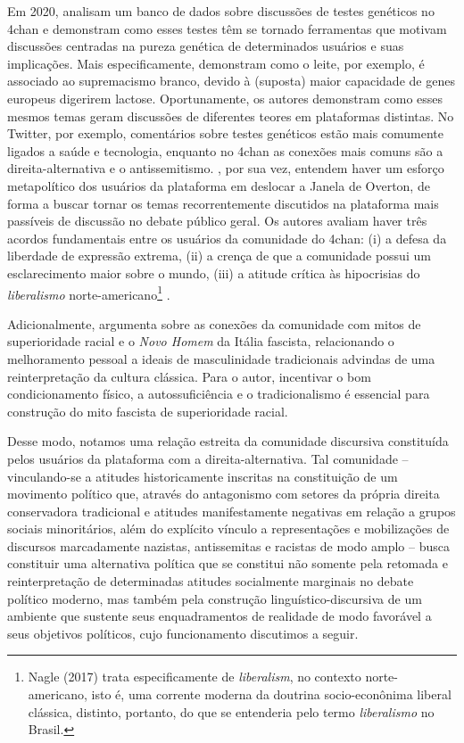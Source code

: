 \documentclass[portuguese]{textolivre}
\begin{document}
Em 2020, \cite{mittos2020analyzing} analisam um banco de dados sobre discussões de testes genéticos no 4chan e demonstram como esses testes têm se tornado ferramentas que motivam discussões centradas na pureza genética de determinados usuários e suas implicações. Mais especificamente, demonstram como o leite, por exemplo, é associado ao supremacismo branco, devido à (suposta) maior capacidade de genes europeus digerirem lactose. Oportunamente, os autores demonstram como esses mesmos temas geram discussões de diferentes teores em plataformas distintas. No Twitter, por exemplo, comentários sobre testes genéticos estão mais comumente ligados a saúde e tecnologia, enquanto no 4chan as conexões mais comuns são a direita-alternativa e o antissemitismo. \textcite{colley2022challenges}, por sua vez, entendem haver um esforço metapolítico dos usuários da plataforma em deslocar a Janela de Overton, de forma a buscar tornar os temas recorrentemente discutidos na plataforma mais passíveis de discussão no debate público geral. Os autores avaliam haver três acordos fundamentais entre os usuários da comunidade do 4chan: (i) a defesa da liberdade de expressão extrema, (ii) a crença de que a comunidade possui um esclarecimento maior sobre o mundo, (iii) a atitude crítica às hipocrisias do \emph{liberalismo} norte-americano\footnote{Nagle (2017) trata especificamente de \emph{liberalism}, no contexto norte-americano, isto é, uma corrente moderna da doutrina socio-econônima liberal clássica, distinto, portanto, do que se entenderia pelo termo \emph{liberalismo} no Brasil.} \cite{nagle2017kill}.

Adicionalmente, \textcite{elley2021rebirth} argumenta sobre as conexões da comunidade com mitos de superioridade racial e o \emph{Novo Homem} da Itália fascista, relacionando o melhoramento pessoal a ideais de masculinidade tradicionais advindas de uma reinterpretação da cultura clássica. Para o autor, incentivar o bom condicionamento físico, a autossuficiência e o tradicionalismo é essencial para construção do mito fascista de superioridade racial.

Desse modo, notamos uma relação estreita da comunidade discursiva constituída pelos usuários da plataforma com a direita-alternativa. Tal comunidade – vinculando-se a atitudes historicamente inscritas na constituição de um movimento político que, através do antagonismo com setores da própria direita conservadora tradicional e atitudes manifestamente negativas em relação a grupos sociais minoritários, além do explícito vínculo a representações e mobilizações de discursos marcadamente nazistas, antissemitas e racistas de modo amplo – busca constituir uma alternativa política que se constitui não somente pela retomada e reinterpretação de determinadas atitudes socialmente marginais no debate político moderno, mas também pela construção linguístico-discursiva de um ambiente que sustente seus enquadramentos de realidade de modo favorável a seus objetivos políticos, cujo funcionamento discutimos a seguir. 
\end{document}

